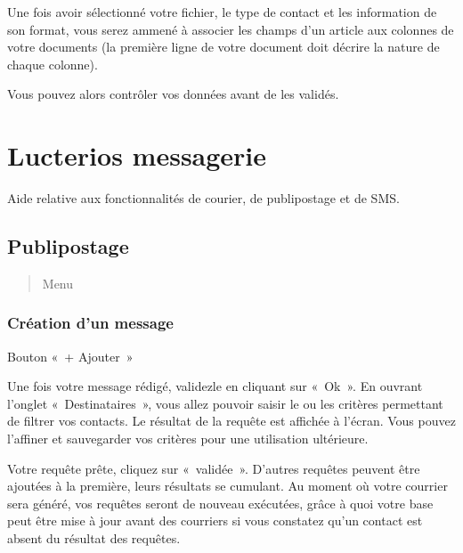 \documentclass[letterpaper,10pt,french]{sphinxmanual}
\begin{document}
\sphinxAtStartPar
Une fois avoir sélectionné votre fichier, le type de contact et les information de son format,
vous serez ammené à associer les champs d’un article aux colonnes de votre documents (la première ligne de votre document doit décrire la nature de chaque colonne).

\sphinxAtStartPar
Vous pouvez alors contrôler vos données avant de les validés.

\sphinxstepscope


\chapter{Lucterios messagerie}
\label{\detokenize{mailing/index:lucterios-messagerie}}\label{\detokenize{mailing/index::doc}}
\sphinxAtStartPar
Aide relative aux fonctionnalités de courier, de publipostage et de SMS.

\sphinxstepscope


\section{Publipostage}
\label{\detokenize{mailing/mailing:publipostage}}\label{\detokenize{mailing/mailing::doc}}\begin{quote}

\sphinxAtStartPar
Menu 
\end{quote}


\subsection{Création d’un message}
\label{\detokenize{mailing/mailing:creation-d-un-message}}
\sphinxAtStartPar
Bouton « + Ajouter »

\sphinxAtStartPar
Une fois votre message rédigé, validez\sphinxhyphen{}le en cliquant sur « Ok ». En ouvrant l’onglet « Destinataires », vous allez pouvoir saisir le ou les critères permettant de filtrer vos contacts. Le résultat de la requête est affichée à l’écran. Vous pouvez l’affiner et sauvegarder vos critères pour une utilisation ultérieure.

\sphinxAtStartPar
Votre requête prête, cliquez sur « validée ». D’autres requêtes peuvent être ajoutées à la première, leurs résultats se cumulant.
Au moment où votre courrier sera généré, vos requêtes seront de nouveau exécutées, grâce à quoi votre base peut être mise à jour avant  des courriers si vous constatez qu’un contact est absent du résultat des requêtes.
\end{document}
